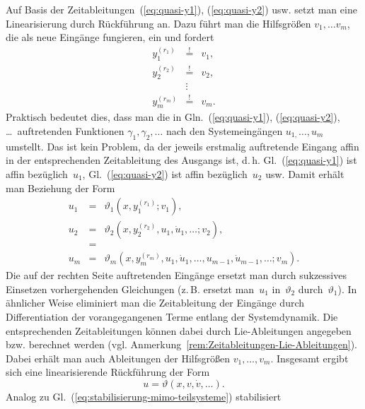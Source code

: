 Auf Basis der Zeitableitungen~(\ref{eq:quasi-y1}), (\ref{eq:quasi-y2})
usw. setzt man eine Linearisierung durch Rückführung an. Dazu führt
man die Hilfsgrößen $v_{1},\ldots v_{m}$, die als neue Eingänge fungieren,
ein und fordert 
\begin{equation}
\begin{array}{lcl}
y_{1}^{(r_{1})} & \stackrel{!}{=} & v_{1},\\
y_{2}^{(r_{2})} & \stackrel{!}{=} & v_{2},\\
 & \vdots\\
y_{m}^{(r_{m})} & \stackrel{!}{=} & v_{m}.
\end{array}\label{eq:forderung-linearisierung-quasi-statisch}
\end{equation}
Praktisch bedeutet dies, dass man die in Gln.~(\ref{eq:quasi-y1}),
(\ref{eq:quasi-y2}), \dots\ auftretenden Funktionen $\gamma_{1},\gamma_{2},\ldots$
nach den Systemeingängen $u_{1,}\ldots,u_{m}$ umstellt. Das ist kein
Problem, da der jeweils erstmalig auftretende Eingang affin in der
entsprechenden Zeitableitung des Ausgangs ist, d.\,h. Gl.~(\ref{eq:quasi-y1})
ist affin bezüglich~$u_{1}$, Gl.~(\ref{eq:quasi-y2}) ist affin
bezüglich~$u_{2}$ usw. Damit erhält man Beziehung der Form 
\[
\begin{array}{lcl}
u_{1} & = & \vartheta_{1}(x,y_{1}^{(r_{1})};v_{1}),\\
u_{2} & = & \vartheta_{2}(x,y_{2}^{(r_{2})},u_{1},\dot{u}_{1},\ldots;v_{2}),\\
 & =\\
u_{m} & = & \vartheta_{m}(x,y_{m}^{(r_{m})},u_{1},\dot{u}_{1},\ldots,u_{m-1},\dot{u}_{m-1},\ldots;v_{m}).
\end{array}
\]
Die auf der rechten Seite auftretenden Eingänge ersetzt man durch
sukzessives Einsetzen vorhergehenden Gleichungen (z.\,B. ersetzt
man~$u_{1}$ in~$\vartheta_{2}$ durch~$\vartheta_{1}$). In ähnlicher
Weise eliminiert man die Zeit\-ableitung der Eingänge durch Differentiation
der vorangegangenen Terme entlang der Systemdynamik. Die entsprechenden
Zeit\-ableitungen können dabei durch Lie-Ableitungen angegeben bzw.
berechnet werden (vgl. Anmerkung~\ref{rem:Zeitableitungen-Lie-Ableitungen}).
Dabei erhält man auch Ableitungen der Hilfsgrößen $v_{1},\ldots,v_{m}$.
Insgesamt ergibt sich eine linearisierende Rückführung der Form 
\begin{equation}
u=\vartheta(x,v,\dot{v},\ldots).\label{eq:quasi-statisch-linearisierend}
\end{equation}
Analog zu Gl.~(\ref{eq:stabilisierung-mimo-teilsysteme}) stabilisiert
